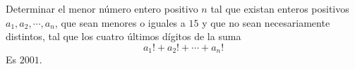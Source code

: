 Determinar el menor número entero positivo $ n$ tal que existan enteros positivos $ a_1,a_2,\cdots,a_n$, que sean menores o iguales a $ 15$ y que no sean necesariamente distintos, tal que los cuatro últimos dígitos de la suma
\[ a_1! + a_2! + \cdots + a_n!\]
Es $ 2001$.
